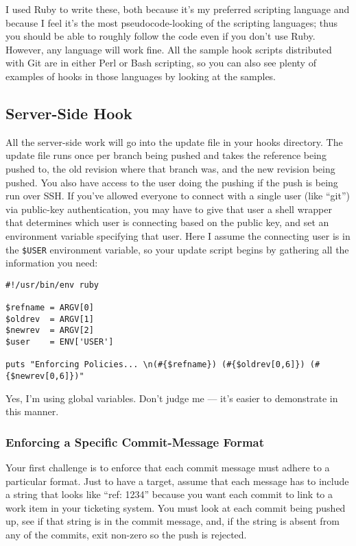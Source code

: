\documentclass[a4paper]{book}
\begin{document}
I used Ruby to write these, both because it's my preferred scripting language and because I feel it's the most pseudocode-looking of the scripting languages; thus you should be able to roughly follow the code even if you don't use Ruby. However, any language will work fine. All the sample hook scripts distributed with Git are in either Perl or Bash scripting, so you can also see plenty of examples of hooks in those languages by looking at the samples.

\subsection{Server-Side Hook}\label{server-side-hook}

All the server-side work will go into the update file in your hooks directory. The update file runs once per branch being pushed and takes the reference being pushed to, the old revision where that branch was, and the new revision being pushed. You also have access to the user doing the pushing if the push is being run over SSH. If you've allowed everyone to connect with a single user (like “git”) via public-key authentication, you may have to give that user a shell wrapper that determines which user is connecting based on the public key, and set an environment variable specifying that user. Here I assume the connecting user is in the \texttt{\$USER} environment variable, so your update script begins by gathering all the information you need:

\begin{shaded}\begin{verbatim}
#!/usr/bin/env ruby

$refname = ARGV[0]
$oldrev  = ARGV[1]
$newrev  = ARGV[2]
$user    = ENV['USER']

puts "Enforcing Policies... \n(#{$refname}) (#{$oldrev[0,6]}) (#{$newrev[0,6]})"
\end{verbatim}\end{shaded}

Yes, I'm using global variables. Don't judge me --- it's easier to demonstrate in this manner.

\subsubsection{Enforcing a Specific Commit-Message Format}

Your first challenge is to enforce that each commit message must adhere to a particular format. Just to have a target, assume that each message has to include a string that looks like “ref: 1234” because you want each commit to link to a work item in your ticketing system. You must look at each commit being pushed up, see if that string is in the commit message, and, if the string is absent from any of the commits, exit non-zero so the push is rejected.
\end{document}
